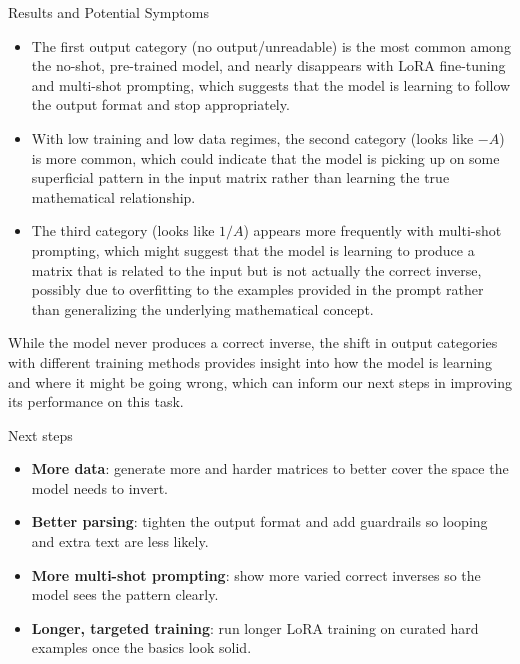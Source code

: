 \documentclass[aspectratio=169,professionalfonts]{beamer}
\begin{document}
\begin{frame}{Results and Potential Symptoms}
\begin{itemize}[itemsep=0.7em]
  \item The first output category (no output/unreadable) is the most common among the no-shot, pre-trained model, and nearly disappears with LoRA fine-tuning and multi-shot prompting, which suggests that the model is learning to follow the output format and stop appropriately.
  \item With low training and low data regimes, the second category (looks like $-A$) is more common, which could indicate that the model is picking up on some superficial pattern in the input matrix rather than learning the true mathematical relationship.
  \item The third category (looks like $1/A$) appears more frequently with multi-shot prompting, which might suggest that the model is learning to produce a matrix that is related to the input but is not actually the correct inverse, possibly due to overfitting to the examples provided in the prompt rather than generalizing the underlying mathematical concept.
\end{itemize}

\vspace{0.5em}

While the model never produces a correct inverse, the shift in output categories with different training methods provides insight into how the model is learning and where it might be going wrong, which can inform our next steps in improving its performance on this task.
\end{frame}

\begin{frame}{Next steps}
\begin{itemize}[itemsep=0.7em]
  \item \textbf{More data}: generate more and harder matrices to better
        cover the space the model needs to invert.
  \item \textbf{Better parsing}: tighten the output format and add
        guardrails so looping and extra text are less likely.
  \item \textbf{More multi-shot prompting}: show more varied correct
        inverses so the model sees the pattern clearly.
  \item \textbf{Longer, targeted training}: run longer LoRA training
        on curated hard examples once the basics look solid.
\end{itemize}
\end{frame}
\end{document}
